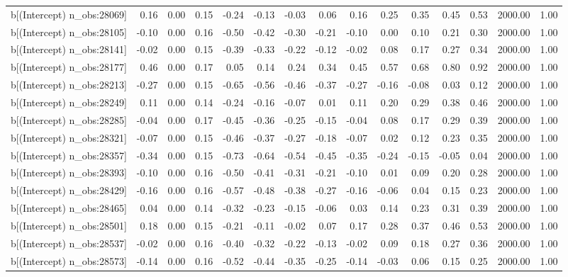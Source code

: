 \begin{table}[ht]
\begin{tabular}{rrrrrrrrrrrrrrr}
  b[(Intercept) n\_obs:28069] & 0.16 & 0.00 & 0.15 & -0.24 & -0.13 & -0.03 & 0.06 & 0.16 & 0.25 & 0.35 & 0.45 & 0.53 & 2000.00 & 1.00 \\ 
  b[(Intercept) n\_obs:28105] & -0.10 & 0.00 & 0.16 & -0.50 & -0.42 & -0.30 & -0.21 & -0.10 & 0.00 & 0.10 & 0.21 & 0.30 & 2000.00 & 1.00 \\ 
  b[(Intercept) n\_obs:28141] & -0.02 & 0.00 & 0.15 & -0.39 & -0.33 & -0.22 & -0.12 & -0.02 & 0.08 & 0.17 & 0.27 & 0.34 & 2000.00 & 1.00 \\ 
  b[(Intercept) n\_obs:28177] & 0.46 & 0.00 & 0.17 & 0.05 & 0.14 & 0.24 & 0.34 & 0.45 & 0.57 & 0.68 & 0.80 & 0.92 & 2000.00 & 1.00 \\ 
  b[(Intercept) n\_obs:28213] & -0.27 & 0.00 & 0.15 & -0.65 & -0.56 & -0.46 & -0.37 & -0.27 & -0.16 & -0.08 & 0.03 & 0.12 & 2000.00 & 1.00 \\ 
  b[(Intercept) n\_obs:28249] & 0.11 & 0.00 & 0.14 & -0.24 & -0.16 & -0.07 & 0.01 & 0.11 & 0.20 & 0.29 & 0.38 & 0.46 & 2000.00 & 1.00 \\ 
  b[(Intercept) n\_obs:28285] & -0.04 & 0.00 & 0.17 & -0.45 & -0.36 & -0.25 & -0.15 & -0.04 & 0.08 & 0.17 & 0.29 & 0.39 & 2000.00 & 1.00 \\ 
  b[(Intercept) n\_obs:28321] & -0.07 & 0.00 & 0.15 & -0.46 & -0.37 & -0.27 & -0.18 & -0.07 & 0.02 & 0.12 & 0.23 & 0.35 & 2000.00 & 1.00 \\ 
  b[(Intercept) n\_obs:28357] & -0.34 & 0.00 & 0.15 & -0.73 & -0.64 & -0.54 & -0.45 & -0.35 & -0.24 & -0.15 & -0.05 & 0.04 & 2000.00 & 1.00 \\ 
  b[(Intercept) n\_obs:28393] & -0.10 & 0.00 & 0.16 & -0.50 & -0.41 & -0.31 & -0.21 & -0.10 & 0.01 & 0.09 & 0.20 & 0.28 & 2000.00 & 1.00 \\ 
  b[(Intercept) n\_obs:28429] & -0.16 & 0.00 & 0.16 & -0.57 & -0.48 & -0.38 & -0.27 & -0.16 & -0.06 & 0.04 & 0.15 & 0.23 & 2000.00 & 1.00 \\ 
  b[(Intercept) n\_obs:28465] & 0.04 & 0.00 & 0.14 & -0.32 & -0.23 & -0.15 & -0.06 & 0.03 & 0.14 & 0.23 & 0.31 & 0.39 & 2000.00 & 1.00 \\ 
  b[(Intercept) n\_obs:28501] & 0.18 & 0.00 & 0.15 & -0.21 & -0.11 & -0.02 & 0.07 & 0.17 & 0.28 & 0.37 & 0.46 & 0.53 & 2000.00 & 1.00 \\ 
  b[(Intercept) n\_obs:28537] & -0.02 & 0.00 & 0.16 & -0.40 & -0.32 & -0.22 & -0.13 & -0.02 & 0.09 & 0.18 & 0.27 & 0.36 & 2000.00 & 1.00 \\ 
  b[(Intercept) n\_obs:28573] & -0.14 & 0.00 & 0.16 & -0.52 & -0.44 & -0.35 & -0.25 & -0.14 & -0.03 & 0.06 & 0.15 & 0.25 & 2000.00 & 1.00 \\ 

\end{tabular}
\end{table}

